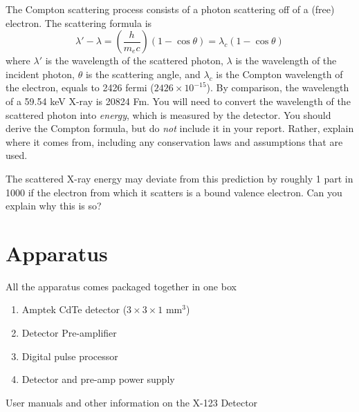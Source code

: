 \documentclass{../lab}
\begin{document}
The Compton scattering process consists of a photon scattering off of a (free) electron. The scattering formula is
\begin{equation}
    \lambda'-\lambda=\left ( \frac{h}{m_ec}\right)\left (1-\cos{\theta}\right )=\lambda_c(1-\cos{\theta})
\end{equation}
where $\lambda'$ is the wavelength of the scattered photon, $\lambda$ is the wavelength of the incident photon, $\theta$ is the scattering angle, and $\lambda_c$ is the Compton wavelength of the electron, equals to 2426 fermi ($2426 \times 10^{-15}$). By comparison, the wavelength of a 59.54 keV X-ray is 20824 Fm. You will need to convert the wavelength of the scattered photon into \emph{energy}, which is measured by the detector. You should derive the Compton formula, but do \emph{not} include it in your report. Rather, explain where it comes from, including any conservation laws and assumptions that are used.

The scattered X-ray energy may deviate from this prediction by roughly 1 part in 1000 if the electron from which it scatters is a bound valence electron. Can you explain why this is so?

\section{Apparatus}

All the apparatus comes packaged together in one box

\begin{enumerate}
    
    \item Amptek CdTe detector ($3 \times 3 \times 1$ mm$^{3}$)

    \item Detector Pre-amplifier

    \item Digital pulse processor

    \item Detector and pre-amp power supply

\end{enumerate}

User manuals and other information on the X-123 Detector
\end{document}

